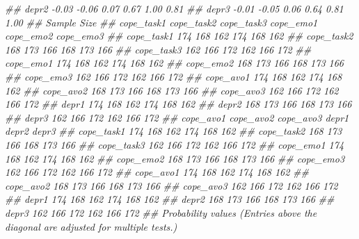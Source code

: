 \documentclass[
  chinese-hans,
  letterpaper,
  DIV=11,
  numbers=noendperiod]{scrartcl}
\newenvironment{Shaded}{\begin{snugshade}}{\end{snugshade}}
\newcommand{\DocumentationTok}[1]{\textcolor[rgb]{0.37,0.37,0.37}{\textit{#1}}}
\begin{document}
\begin{Shaded}
\begin{Highlighting}[numbers=left,,]
\DocumentationTok{\#\# depr2          {-}0.03     {-}0.06      0.07  0.67  1.00  0.81}
\DocumentationTok{\#\# depr3          {-}0.01     {-}0.05      0.06  0.64  0.81  1.00}
\DocumentationTok{\#\# Sample Size }
\DocumentationTok{\#\#            cope\_task1 cope\_task2 cope\_task3 cope\_emo1 cope\_emo2 cope\_emo3}
\DocumentationTok{\#\# cope\_task1        174        168        162       174       168       162}
\DocumentationTok{\#\# cope\_task2        168        173        166       168       173       166}
\DocumentationTok{\#\# cope\_task3        162        166        172       162       166       172}
\DocumentationTok{\#\# cope\_emo1         174        168        162       174       168       162}
\DocumentationTok{\#\# cope\_emo2         168        173        166       168       173       166}
\DocumentationTok{\#\# cope\_emo3         162        166        172       162       166       172}
\DocumentationTok{\#\# cope\_avo1         174        168        162       174       168       162}
\DocumentationTok{\#\# cope\_avo2         168        173        166       168       173       166}
\DocumentationTok{\#\# cope\_avo3         162        166        172       162       166       172}
\DocumentationTok{\#\# depr1             174        168        162       174       168       162}
\DocumentationTok{\#\# depr2             168        173        166       168       173       166}
\DocumentationTok{\#\# depr3             162        166        172       162       166       172}
\DocumentationTok{\#\#            cope\_avo1 cope\_avo2 cope\_avo3 depr1 depr2 depr3}
\DocumentationTok{\#\# cope\_task1       174       168       162   174   168   162}
\DocumentationTok{\#\# cope\_task2       168       173       166   168   173   166}
\DocumentationTok{\#\# cope\_task3       162       166       172   162   166   172}
\DocumentationTok{\#\# cope\_emo1        174       168       162   174   168   162}
\DocumentationTok{\#\# cope\_emo2        168       173       166   168   173   166}
\DocumentationTok{\#\# cope\_emo3        162       166       172   162   166   172}
\DocumentationTok{\#\# cope\_avo1        174       168       162   174   168   162}
\DocumentationTok{\#\# cope\_avo2        168       173       166   168   173   166}
\DocumentationTok{\#\# cope\_avo3        162       166       172   162   166   172}
\DocumentationTok{\#\# depr1            174       168       162   174   168   162}
\DocumentationTok{\#\# depr2            168       173       166   168   173   166}
\DocumentationTok{\#\# depr3            162       166       172   162   166   172}
\DocumentationTok{\#\# Probability values (Entries above the diagonal are adjusted for multiple tests.) }

\end{Highlighting}
\end{Shaded}
\end{document}
